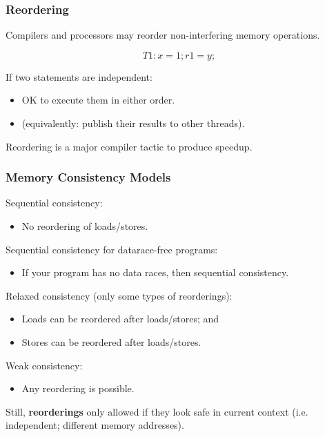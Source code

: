 \begin{frame}
  \frametitle{Reordering}

  
     Compilers and processors may reorder non-interfering memory
     operations.

      \[ T1: x = 1; r1 = y; \]

     If two statements are independent:
     \begin{itemize}
        \item OK to execute them in either order.
        \item (equivalently: publish their results to other threads).
     \end{itemize}

     Reordering is a major compiler tactic to produce speedup.
  
\end{frame}


\begin{frame}
  \frametitle{Memory Consistency Models}

  
    Sequential consistency:
      \begin{itemize}
        \item No reordering of loads/stores.
      \end{itemize}
    Sequential consistency for datarace-free programs:
      \begin{itemize}
        \item If your program
  has no data races, then sequential consistency.
      \end{itemize}
    Relaxed consistency (only some types of reorderings):
      \begin{itemize}
        \item Loads can be reordered after loads/stores; and
        \item Stores can be reordered after loads/stores.
      \end{itemize}
    Weak consistency:
      \begin{itemize}
        \item Any reordering is possible.
      \end{itemize}

  Still, {\bf reorderings} only allowed if they look safe in current context
  (i.e. independent; different memory addresses).
  
\end{frame}

